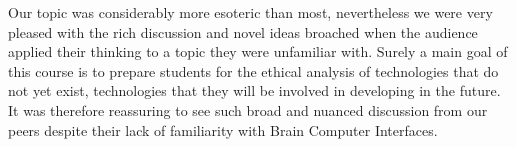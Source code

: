 \documentclass[12pt]{article}
\begin{document}
Our topic was considerably more esoteric than most, nevertheless we were very pleased with the rich discussion and novel ideas broached when the audience applied their thinking to a topic they were unfamiliar with. Surely a main goal of this course is to prepare students for the ethical analysis of technologies that do not yet exist, technologies that they will be involved in developing in the future. It was therefore reassuring to see such broad and nuanced discussion from our peers despite their lack of familiarity with Brain Computer Interfaces.
\end{document}
